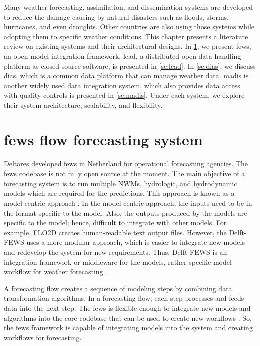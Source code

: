 Many weather forecasting, assimilation, and dissemination systems are developed to reduce the damage-causing by natural disasters such as floods, storms, hurricanes, and even droughts. Other countries are also using those systems while adopting them to specific weather conditions. This chapter presents a literature review on existing systems and their architectural designs. In \cref{se:fews}, we present \acrfull{fews}, an open model integration framework. \acrfull{lead}, a distributed open data handling platform as closed-source software, is presented in \cref{se:lead}. In \cref{se:dias}, we discuss \acrfull{dias}, which is a common data platform that can manage weather data. \acrfull{madis} is another widely used data integration system, which also provides data access with quality controls is presented in \cref{se:madis}. Under each system, we explore their system architecture, scalability, and flexibility.

\section{\acrshort{fews} flow forecasting system}
\label{se:fews}

Deltares developed \acrshort{fews} \cite{Werner2013TheSystem} in Netherland for operational forecasting agencies. The \acrshort{fews} codebase is not fully open source at the moment. The main objective of a forecasting system is to run multiple NWMs, hydrologic, and hydrodynamic models which are required for the predictions. This approach is known as a model-centric approach \cite{Werner2005FloodCatchments}. In the model-centric approach, the inputs need to be in the format specific to the model. Also, the outputs produced by the models are specific to the model; hence, difficult to integrate with other models. For example, FLO2D creates human-readable text output files. However, the Delft-FEWS uses a more modular approach, which is easier to integrate new models and redevelop the system for new requirements. Thus, Delft-FEWS is an integration framework or middleware for the models, rather specific model workflow for weather forecasting.

A forecasting flow creates a sequence of modeling steps by combining data transformation algorithms. In a forecasting flow, each step processes and feeds data into the next step. The \acrshort{fews} is flexible enough to integrate new models and algorithms into the core codebase that can be used to create new workflows \cite{Werner2013TheSystem}. So, the \acrshort{fews} framework is capable of integrating models into the system and creating workflows for forecasting.

